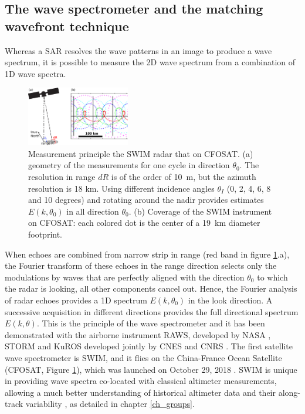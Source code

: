 \subsection{The wave spectrometer and the matching wavefront technique}
Whereas a SAR resolves the wave patterns in an image to produce a wave spectrum, 
it is possible to measure the 2D wave spectrum from a combination of 1D wave spectra. 
\begin{figure}[htb]
\centerline{\includegraphics[width=0.4\textwidth]{FIGS_CH_SAT/CFOSAT_v2.pdf}}
\caption{Measurement principle  the SWIM radar that on CFOSAT. (a) geometry of the measurements for one cycle 
in direction $\theta_0$. The resolution in range $dR$ is of the order of 10~m, but the azimuth resolution is 18 km. Using different incidence angles $\theta_I$ (0, 2, 4, 6, 8 and 10 degrees) 
and rotating around the nadir provides estimates $E(k,\theta_0)$ in all direction $\theta_0$. (b) Coverage of the SWIM instrument on CFOSAT: each colored dot is the center 
of a 19~km diameter footprint.}
\label{CFOSAT}
\end{figure}

When echoes are combined from narrow strip in range (red band in figure 
\ref{CFOSAT}.a), the Fourier transform of these echoes in the range direction selects only the modulations by waves that are perfectly aligned with the direction 
$\theta_0$ to which the radar is looking, all other components cancel out.  Hence, the Fourier analysis of radar echoes provides a 1D spectrum  $E(k,\theta_0)$  
in the look direction. 
A successive acquisition in different directions provides the full directional spectrum $E(k,\theta)$.  
This is the principle of the wave spectrometer and it has been demonstrated with the airborne instrument
RAWS, developed by NASA \citep{Jackson&al.1985}, STORM and KuROS developed jointly by CNES and CNRS \citep{Hauser&al.1992,Caudal&al.2014}.
The first satellite wave spectrometer is SWIM, and it flies on the China-France Ocean Satellite (CFOSAT, Figure \ref{CFOSAT}), which was launched on October 29, 2018 \citep{Hauser&al.2021}. SWIM is unique in providing wave spectra co-located with classical altimeter measurements, allowing a much better understanding of historical altimeter data and their along-track variability \citep{DeCarlo&al.2023}, as detailed in chapter \ref{ch_groups}. 

